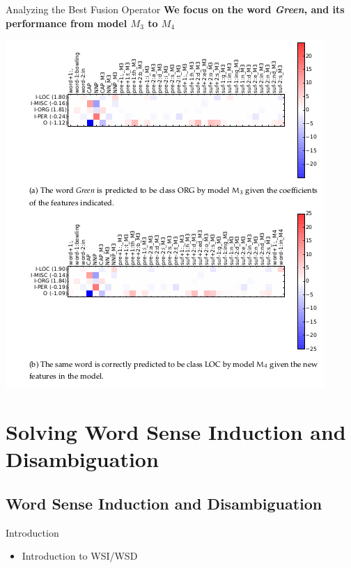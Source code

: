 \documentclass[10pt,xcolor=table]{beamer}
\begin{document}
\begin{frame}{Analyzing the Best Fusion Operator}
\large \textbf{We focus on the word \textit{Green}, and its performance from model $M_3$ to $M_4$}
\begin{center}
\includegraphics[width=0.6\linewidth]{image2/Chapitre4/fanalm3_m4.png}
\end{center}
\end{frame}

\section[Applications to NLP]{Solving Word Sense Induction and Disambiguation}

\subsection{Word Sense Induction and Disambiguation}
\begin{frame}{Introduction}
\begin{center}
\begin{itemize}
\item Introduction to WSI/WSD
\end{itemize}
\end{center}
\end{frame}
\end{document}
